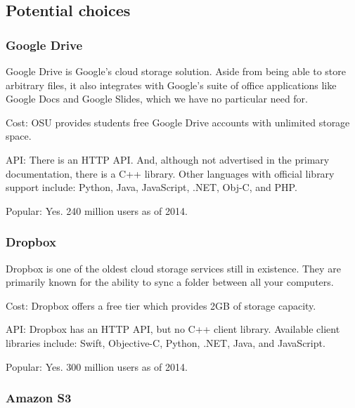 \documentclass[onecolumn, draftclsnofoot,10pt, compsoc]{IEEEtran}
\begin{document}
\subsection{ Potential choices }
\subsubsection{ Google Drive }

Google Drive is Google's cloud storage solution. Aside from being able to store arbitrary files, it also integrates with Google's suite of office applications like Google Docs and Google Slides, which we have no particular need for.

Cost: OSU provides students free Google Drive accounts with unlimited storage space.

API: There is an HTTP API.
And, although not advertised in the primary documentation, there is a C++ library. \cite{drivecpp}
Other languages with official library support include:  Python, Java, JavaScript, .NET, Obj-C, and PHP.
\cite{driveapi}

Popular: Yes. 240 million users as of 2014. \cite{fortune}

\subsubsection{ Dropbox }

Dropbox \cite{dropbox} is one of the oldest cloud storage services still in existence. They are primarily known for the ability to sync a folder between all your computers.

Cost: Dropbox offers a free tier which provides 2GB of storage capacity.
\cite{dropboxplans}

API: Dropbox has an HTTP API,
\cite{dropboxapi}
but no C++ client library.
Available client libraries include:
Swift, Objective-C, Python, .NET, Java, and JavaScript.




Popular: Yes. 300 million users as of 2014. \cite{fortune}

\subsubsection{ Amazon S3 }
\end{document}
